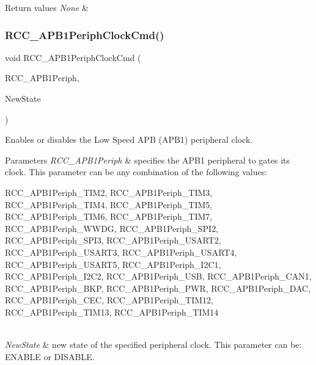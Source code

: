 \begin{DoxyRetVals}{Return values}
{\em None} & \\
\hline
\end{DoxyRetVals}
\mbox{\label{group___r_c_c___private___functions_gaee7cc5d73af7fe1986fceff8afd3973e}} 
\subsubsection{\texorpdfstring{RCC\_APB1PeriphClockCmd()}{RCC\_APB1PeriphClockCmd()}}
{\footnotesize\ttfamily void R\+C\+C\+\_\+\+A\+P\+B1\+Periph\+Clock\+Cmd (\begin{DoxyParamCaption}\item[{uint32\+\_\+t}]{R\+C\+C\+\_\+\+A\+P\+B1\+Periph,  }\item[{\mbox{\hyperlink{group___exported__types_gac9a7e9a35d2513ec15c3b537aaa4fba1}{Functional\+State}}}]{New\+State }\end{DoxyParamCaption})}



Enables or disables the Low Speed A\+PB (A\+P\+B1) peripheral clock. 


\begin{DoxyParams}{Parameters}
{\em R\+C\+C\+\_\+\+A\+P\+B1\+Periph} & specifies the A\+P\+B1 peripheral to gates its clock. This parameter can be any combination of the following values\+: \begin{DoxyItemize}
\item R\+C\+C\+\_\+\+A\+P\+B1\+Periph\+\_\+\+T\+I\+M2, R\+C\+C\+\_\+\+A\+P\+B1\+Periph\+\_\+\+T\+I\+M3, R\+C\+C\+\_\+\+A\+P\+B1\+Periph\+\_\+\+T\+I\+M4, R\+C\+C\+\_\+\+A\+P\+B1\+Periph\+\_\+\+T\+I\+M5, R\+C\+C\+\_\+\+A\+P\+B1\+Periph\+\_\+\+T\+I\+M6, R\+C\+C\+\_\+\+A\+P\+B1\+Periph\+\_\+\+T\+I\+M7, R\+C\+C\+\_\+\+A\+P\+B1\+Periph\+\_\+\+W\+W\+DG, R\+C\+C\+\_\+\+A\+P\+B1\+Periph\+\_\+\+S\+P\+I2, R\+C\+C\+\_\+\+A\+P\+B1\+Periph\+\_\+\+S\+P\+I3, R\+C\+C\+\_\+\+A\+P\+B1\+Periph\+\_\+\+U\+S\+A\+R\+T2, R\+C\+C\+\_\+\+A\+P\+B1\+Periph\+\_\+\+U\+S\+A\+R\+T3, R\+C\+C\+\_\+\+A\+P\+B1\+Periph\+\_\+\+U\+S\+A\+R\+T4, R\+C\+C\+\_\+\+A\+P\+B1\+Periph\+\_\+\+U\+S\+A\+R\+T5, R\+C\+C\+\_\+\+A\+P\+B1\+Periph\+\_\+\+I2\+C1, R\+C\+C\+\_\+\+A\+P\+B1\+Periph\+\_\+\+I2\+C2, R\+C\+C\+\_\+\+A\+P\+B1\+Periph\+\_\+\+U\+SB, R\+C\+C\+\_\+\+A\+P\+B1\+Periph\+\_\+\+C\+A\+N1, R\+C\+C\+\_\+\+A\+P\+B1\+Periph\+\_\+\+B\+KP, R\+C\+C\+\_\+\+A\+P\+B1\+Periph\+\_\+\+P\+WR, R\+C\+C\+\_\+\+A\+P\+B1\+Periph\+\_\+\+D\+AC, R\+C\+C\+\_\+\+A\+P\+B1\+Periph\+\_\+\+C\+EC, R\+C\+C\+\_\+\+A\+P\+B1\+Periph\+\_\+\+T\+I\+M12, R\+C\+C\+\_\+\+A\+P\+B1\+Periph\+\_\+\+T\+I\+M13, R\+C\+C\+\_\+\+A\+P\+B1\+Periph\+\_\+\+T\+I\+M14 \end{DoxyItemize}
\\
\hline
{\em New\+State} & new state of the specified peripheral clock. This parameter can be\+: E\+N\+A\+B\+LE or D\+I\+S\+A\+B\+LE. \\
\hline
\end{DoxyParams}


